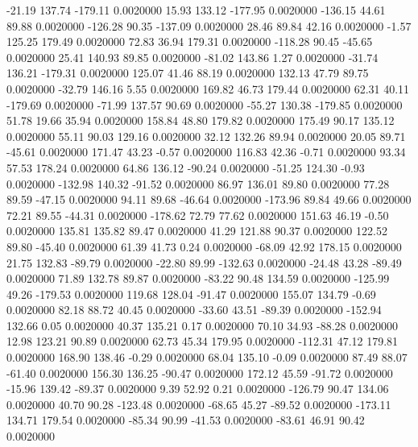   -21.19  137.74 -179.11   0.0020000
   15.93  133.12 -177.95   0.0020000
 -136.15   44.61   89.88   0.0020000
 -126.28   90.35 -137.09   0.0020000
   28.46   89.84   42.16   0.0020000
   -1.57  125.25  179.49   0.0020000
   72.83   36.94  179.31   0.0020000
 -118.28   90.45  -45.65   0.0020000
   25.41  140.93   89.85   0.0020000
  -81.02  143.86    1.27   0.0020000
  -31.74  136.21 -179.31   0.0020000
  125.07   41.46   88.19   0.0020000
  132.13   47.79   89.75   0.0020000
  -32.79  146.16    5.55   0.0020000
  169.82   46.73  179.44   0.0020000
   62.31   40.11 -179.69   0.0020000
  -71.99  137.57   90.69   0.0020000
  -55.27  130.38 -179.85   0.0020000
   51.78   19.66   35.94   0.0020000
  158.84   48.80  179.82   0.0020000
  175.49   90.17  135.12   0.0020000
   55.11   90.03  129.16   0.0020000
   32.12  132.26   89.94   0.0020000
   20.05   89.71  -45.61   0.0020000
  171.47   43.23   -0.57   0.0020000
  116.83   42.36   -0.71   0.0020000
   93.34   57.53  178.24   0.0020000
   64.86  136.12  -90.24   0.0020000
  -51.25  124.30   -0.93   0.0020000
 -132.98  140.32  -91.52   0.0020000
   86.97  136.01   89.80   0.0020000
   77.28   89.59  -47.15   0.0020000
   94.11   89.68  -46.64   0.0020000
 -173.96   89.84   49.66   0.0020000
   72.21   89.55  -44.31   0.0020000
 -178.62   72.79   77.62   0.0020000
  151.63   46.19   -0.50   0.0020000
  135.81  135.82   89.47   0.0020000
   41.29  121.88   90.37   0.0020000
  122.52   89.80  -45.40   0.0020000
   61.39   41.73    0.24   0.0020000
  -68.09   42.92  178.15   0.0020000
   21.75  132.83  -89.79   0.0020000
  -22.80   89.99 -132.63   0.0020000
  -24.48   43.28  -89.49   0.0020000
   71.89  132.78   89.87   0.0020000
  -83.22   90.48  134.59   0.0020000
 -125.99   49.26 -179.53   0.0020000
  119.68  128.04  -91.47   0.0020000
  155.07  134.79   -0.69   0.0020000
   82.18   88.72   40.45   0.0020000
  -33.60   43.51  -89.39   0.0020000
 -152.94  132.66    0.05   0.0020000
   40.37  135.21    0.17   0.0020000
   70.10   34.93  -88.28   0.0020000
   12.98  123.21   90.89   0.0020000
   62.73   45.34  179.95   0.0020000
 -112.31   47.12  179.81   0.0020000
  168.90  138.46   -0.29   0.0020000
   68.04  135.10   -0.09   0.0020000
   87.49   88.07  -61.40   0.0020000
  156.30  136.25  -90.47   0.0020000
  172.12   45.59  -91.72   0.0020000
  -15.96  139.42  -89.37   0.0020000
    9.39   52.92    0.21   0.0020000
 -126.79   90.47  134.06   0.0020000
   40.70   90.28 -123.48   0.0020000
  -68.65   45.27  -89.52   0.0020000
 -173.11  134.71  179.54   0.0020000
  -85.34   90.99  -41.53   0.0020000
  -83.61   46.91   90.42   0.0020000
